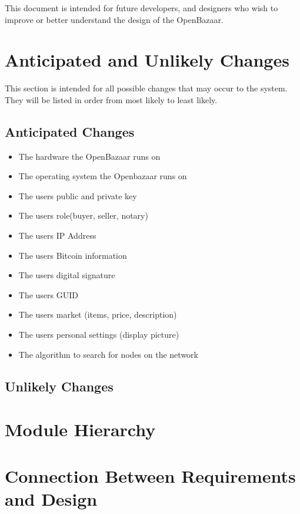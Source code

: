 \documentclass{article}
\begin{document}
This document is intended for future developers, and designers who wish to improve or better understand the design of the OpenBazaar.


\section*{Anticipated and Unlikely Changes}
This section is intended for all possible changes that may occur to the system. They will be listed in order from most likely to least likely.
\newline
\newline
\subsection{Anticipated Changes}
\begin{itemize}
\item
The hardware the OpenBazaar runs on
\item
The operating system the Openbazaar runs on
\item
The users public and private key
\item
The users role(buyer, seller, notary)
\item
The users IP Address
\item
The users Bitcoin information
\item
The users digital signature
\item
The users GUID
\item
The users market (items, price, description)
\item
The users personal settings (display picture)
\item
The algorithm to search for nodes on the network
\end{itemize}

\subsection{Unlikely Changes}


\section*{Module Hierarchy}

\section*{Connection Between Requirements and Design}
\end{document}
